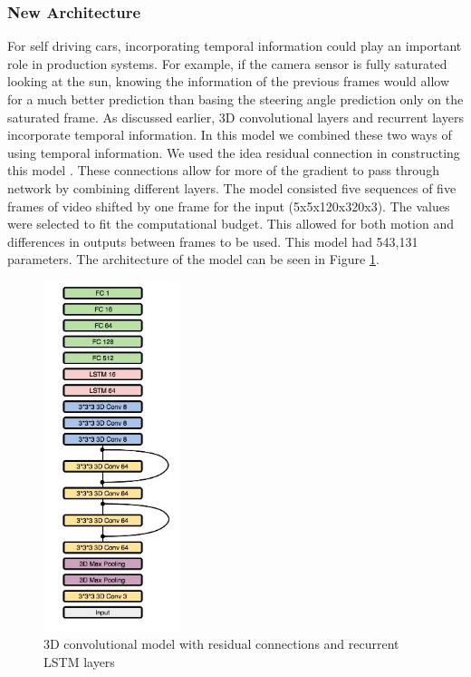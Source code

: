 \documentclass[10pt,twocolumn,letterpaper]{article}
\begin{document}
\subsubsection{New Architecture}
For self driving cars, incorporating temporal information could play an important role in production systems. For example, if the camera sensor is fully saturated looking at the sun, knowing the information of the previous frames would allow for a much better prediction than basing the steering angle prediction only on the saturated frame. As discussed earlier, 3D convolutional layers and recurrent layers incorporate temporal information. In this model we combined these two ways of using temporal information. We used the idea residual connection in constructing this model \cite{he2016deep}. These connections allow for more of the gradient to pass through network by combining different layers. The model consisted five sequences of five frames of video shifted by one frame for the input (5x5x120x320x3). The values were selected to fit the computational budget. This allowed for both motion and differences in outputs between frames to be used. This model had 543,131 parameters. The architecture of the model can be seen in Figure \ref{3dconvlstm_graph}.



\begin{figure}[!htb]
	\includegraphics[width=4cm]{3d_lstm_model_architecture.JPG}
	\centering
	\caption{3D convolutional model with residual connections and recurrent LSTM layers}
	\label{3dconvlstm_graph}
\end{figure}
\end{document}
